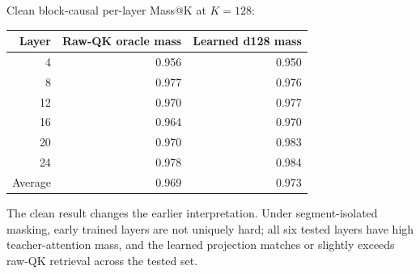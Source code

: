 \documentclass[10pt]{article}
\begin{document}
Clean block-causal per-layer Mass@K at $K=128$:
\begin{table}[h]
\centering
\begin{tabular}{rrr}
\toprule
Layer & Raw-QK oracle mass & Learned d128 mass\\
\midrule
4 & 0.956 & 0.950\\
8 & 0.977 & 0.976\\
12 & 0.970 & 0.977\\
16 & 0.964 & 0.970\\
20 & 0.970 & 0.983\\
24 & 0.978 & 0.984\\
Average & 0.969 & 0.973\\
\bottomrule
\end{tabular}
\end{table}
The clean result changes the earlier interpretation. Under segment-isolated
masking, early trained layers are not uniquely hard; all six tested layers have
high teacher-attention mass, and the learned projection matches or slightly
exceeds raw-QK retrieval across the tested set.
\end{document}
